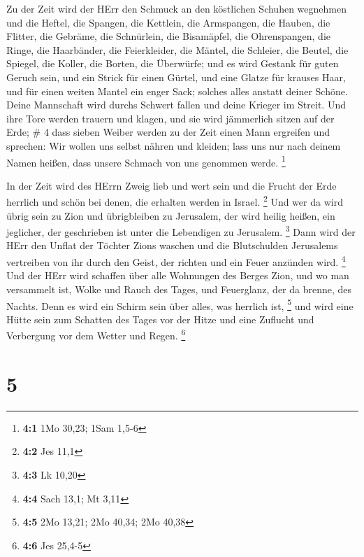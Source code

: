  Zu der Zeit wird der HErr den Schmuck an den köstlichen
Schuhen wegnehmen und die Heftel, die Spangen,  die
Kettlein, die Armspangen, die Hauben,  die Flitter, die
Gebräme, die Schnürlein, die Bisamäpfel, die Ohrenspangen, 
die Ringe, die Haarbänder,  die Feierkleider, die Mäntel,
die Schleier, die Beutel,  die Spiegel, die Koller, die
Borten, die Überwürfe;  und es wird Gestank für guten
Geruch sein, und ein Strick für einen Gürtel, und eine Glatze für
krauses Haar, und für einen weiten Mantel ein enger Sack; solches alles
anstatt deiner Schöne.  Deine Mannschaft wird durchs
Schwert fallen und deine Krieger im Streit.  Und ihre Tore
werden trauern und klagen, und sie wird jämmerlich sitzen auf der Erde;
\# 4  dass sieben Weiber werden zu der Zeit einen Mann
ergreifen und sprechen: Wir wollen uns selbst nähren und kleiden; lass
uns nur nach deinem Namen heißen, dass unsere Schmach von uns genommen
werde. \footnote{\textbf{4:1} 1Mo 30,23; 1Sam 1,5-6}

 In der Zeit wird des HErrn Zweig lieb und wert sein und die
Frucht der Erde herrlich und schön bei denen, die erhalten werden in
Israel. \footnote{\textbf{4:2} Jes 11,1}  Und wer da wird
übrig sein zu Zion und übrigbleiben zu Jerusalem, der wird heilig
heißen, ein jeglicher, der geschrieben ist unter die Lebendigen zu
Jerusalem. \footnote{\textbf{4:3} Lk 10,20}  Dann wird der
HErr den Unflat der Töchter Zions waschen und die Blutschulden
Jerusalems vertreiben von ihr durch den Geist, der richten und ein Feuer
anzünden wird. \footnote{\textbf{4:4} Sach 13,1; Mt 3,11} 
Und der HErr wird schaffen über alle Wohnungen des Berges Zion, und wo
man versammelt ist, Wolke und Rauch des Tages, und Feuerglanz, der da
brenne, des Nachts. Denn es wird ein Schirm sein über alles, was
herrlich ist, \footnote{\textbf{4:5} 2Mo 13,21; 2Mo 40,34; 2Mo 40,38}
 und wird eine Hütte sein zum Schatten des Tages vor der
Hitze und eine Zuflucht und Verbergung vor dem Wetter und Regen.
\footnote{\textbf{4:6} Jes 25,4-5}

\hypertarget{section-2}{%
\section{5}\label{section-2}}

